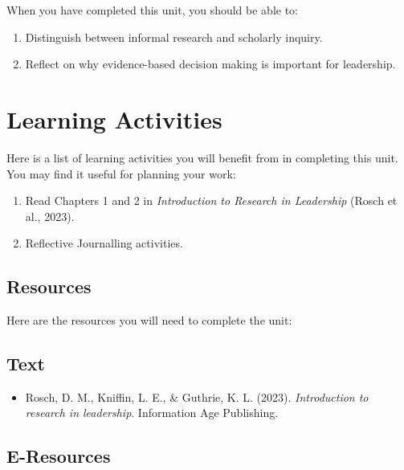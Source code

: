 \documentclass[
  letterpaper,
  DIV=11,
  numbers=noendperiod]{scrreprt}
\providecommand{\tightlist}{%
  \setlength{\itemsep}{0pt}\setlength{\parskip}{0pt}}\usepackage{longtable,booktabs,array}
\begin{document}

When you have completed this unit, you should be able to:

\begin{enumerate}
\def\labelenumi{\arabic{enumi}.}
\tightlist
\item
  Distinguish between informal research and scholarly inquiry.
\item
  Reflect on why evidence-based decision making is important for
  leadership.
\end{enumerate}

\section*{Learning Activities}\label{learning-activities}


Here is a list of learning activities you will benefit from in
completing this unit. You may find it useful for planning your work:

\begin{enumerate}
\def\labelenumi{\arabic{enumi}.}
\tightlist
\item
  Read Chapters 1 and 2 in \emph{Introduction to Research in Leadership}
  (Rosch et al., 2023).
\item
  Reflective Journalling activities.
\end{enumerate}

\subsection*{Resources}\label{resources}

Here are the resources you will need to complete the unit:

\subsection*{Text}\label{text}

\begin{itemize}
\tightlist
\item
  Rosch, D. M., Kniffin, L. E., \& Guthrie, K. L. (2023).
  \emph{Introduction to research in leadership}. Information Age
  Publishing.
\end{itemize}

\subsection*{E-Resources}\label{e-resources}
\end{document}

